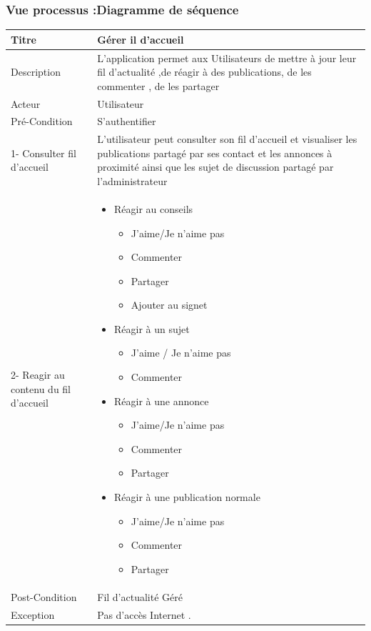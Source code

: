 \documentclass[11pt,a4paper,oneside]{book}
\begin{document}
				\subsubsection{Vue processus :Diagramme de séquence}
				\begin{tabular}{ |p{3cm}|p{10cm}|  }
					
					\hline
					Titre&  Gérer il d'accueil\\
					\hline
					Description  & L’application permet aux Utilisateurs de mettre à jour leur fil d’actualité ,de réagir à des publications, de les commenter , de les partager\\
					\hline
					Acteur&Utilisateur\\
					\hline
					Pré-Condition & S'authentifier 
					\\
					\hline
					1- Consulter fil d'accueil & L’utilisateur peut consulter son fil d’accueil et visualiser les publications partagé par ses contact et les annonces à proximité ainsi que les sujet de discussion partagé par l’administrateur\\
					
					2- Reagir au contenu du fil d'accueil & 
					\begin{itemize} 
						\item Réagir au conseils
						\begin{itemize}
							\item J’aime/Je n’aime pas
							\item Commenter
							\item Partager
							\item Ajouter au signet 
						\end{itemize}
						\item Réagir à un sujet 
						\begin{itemize}
							\item J'aime / Je n'aime pas 
							\item Commenter
						\end{itemize}
						\item Réagir à une annonce
						\begin{itemize}
							\item J’aime/Je n’aime pas
							\item Commenter
							\item Partager
						\end{itemize}
						\item Réagir à une publication normale
						\begin{itemize}
							\item J’aime/Je n’aime pas
							\item Commenter
							\item Partager
						\end{itemize}
						\end{itemize} \\
						\hline
						Post-Condition& Fil d'actualité Géré\\
						\hline
						Exception& Pas d'accès Internet . \\
						\hline
					\end{tabular}
\end{document}
